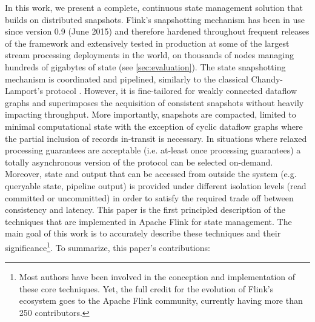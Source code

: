 


In this work, we present a complete, continuous state management solution that builds on distributed snapshots. Flink's snapshotting mechanism has been in use since version 0.9 (June 2015) and therefore hardened throughout frequent releases of the framework and extensively tested in production at some of the largest stream processing deployments in the world, on thousands of nodes  managing hundreds of gigabytes of state (see \autoref{sec:evaluation}). 
The state snapshotting mechanism is coordinated and pipelined, similarly to the classical Chandy-Lamport's protocol \cite{chandy1985distributed}. However, it is fine-tailored for weakly connected dataflow graphs and superimposes the acquisition of consistent snapshots without heavily impacting throughput. More importantly, snapshots are compacted, limited to minimal computational state with the exception of cyclic dataflow graphs where the partial inclusion of records in-transit is necessary. In situations where relaxed processing guarantees are acceptable (i.e. at-least once processing guarantees) a totally asynchronous version of the protocol can be selected on-demand. 
Moreover, state and output that can be accessed from outside the system (e.g. queryable state, pipeline output) is provided under different isolation levels (read committed or uncommitted) in order to satisfy the required trade off between consistency and latency. 
This paper is the first principled description of the techniques that are implemented in Apache Flink for state management. The main goal of this work is to accurately describe these techniques and their significance\footnote{Most authors have been involved in the conception and implementation of these core techniques. Yet, the full credit for the evolution of Flink's ecosystem goes to the Apache Flink community, currently having more than 250 contributors.}. To summarize, this paper's contributions:

